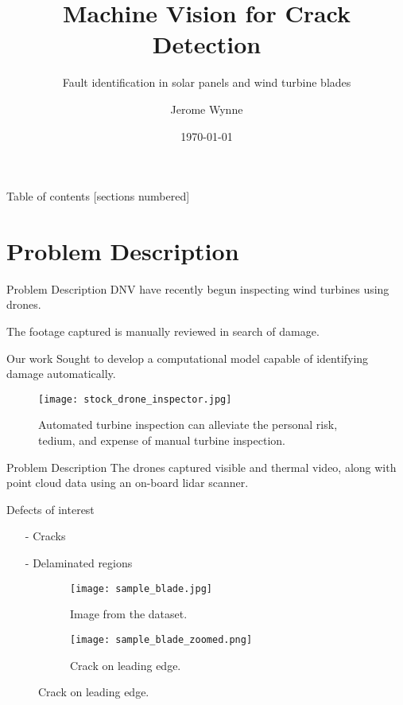 \documentclass[10pt]{beamer}
\title{Machine Vision for Crack Detection}
\subtitle{Fault identification in solar panels and wind turbine blades}
\date{\today}
\author{Jerome Wynne}
\institute{University of Bristol, DNV-GL}
\begin{document}
\maketitle

\begin{frame}{Table of contents}
  [sections numbered]
  \tableofcontents[hideallsubsections]
\end{frame}

\section{Problem Description}
\begin{frame}[fragile]{Problem Description}
	DNV have recently begun inspecting wind turbines using drones.
	
	 The footage captured is manually reviewed in search of damage.
	
	\begin{alertblock}{Our work}
	Sought to develop a computational model capable of identifying damage automatically.
	\end{alertblock}
	\begin{figure}
		\texttt{[image: stock\_drone\_inspector.jpg]}
		\caption{Automated turbine inspection can alleviate the personal risk, tedium, and expense of manual turbine inspection.}
	\end{figure}
	
\end{frame}

\begin{frame}[fragile]{Problem Description}
	The drones captured visible and thermal video, along with point cloud data using an on-board lidar scanner.
	
	\begin{alertblock}{Defects of interest}
	\begin{itemize}
		\item[-] Cracks
		\item[-] Delaminated regions
	\end{itemize}
	\end{alertblock}
	
	\begin{figure}
		\begin{subfigure}[b]{0.35\textwidth}
			\texttt{[image: sample\_blade.jpg]}
			\caption{Image from the dataset.}
		\end{subfigure}
		\qquad
		\begin{subfigure}[b]{0.35\textwidth}
				\texttt{[image: sample\_blade\_zoomed.png]}
			\caption{Crack on leading edge.}
		\end{subfigure}
	\end{figure}
	
\end{frame}
\end{document}
